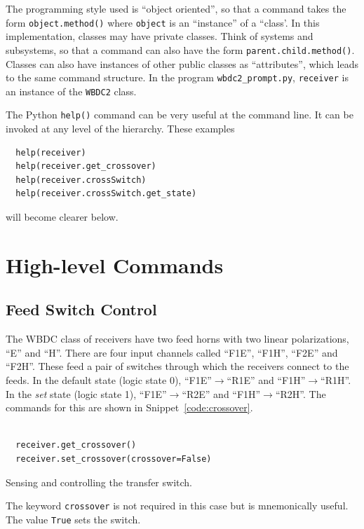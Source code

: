 \documentclass[letterpaper,11pt]{book}
\begin{document}
The programming style used is ``object oriented'', so that a command takes the 
form {\tt object.method()} where {\tt object} is an ``instance'' of a ``class'.
In this implementation, classes may have private classes. Think of systems and 
subsystems, so that a command can also have the form
{\tt parent.child.method()}. Classes can also have instances of other public
classes as ``attributes'', which leads to the same command structure.
In the program {\tt wbdc2\_prompt.py}, {\tt receiver} is an instance of the
{\tt WBDC2} class.

The Python {\tt help()} command can be very useful at the command line.  It can
be invoked at any level of the hierarchy.  These examples 
\begin{verbatim}
  help(receiver)
  help(receiver.get_crossover)
  help(receiver.crossSwitch)
  help(receiver.crossSwitch.get_state)\end{verbatim}
will become clearer below.

\section{High-level Commands}

\subsection{Feed Switch Control}\label{subsec:feed_switch}

The WBDC class of receivers have two feed horns with two linear polarizations,
``E'' and ``H''.  There are four input channels called ``F1E'', ``F1H'',
``F2E'' and ``F2H''.  These feed a pair of switches through which the receivers
connect to the feeds.  In the default state (logic state 0),
``F1E''$\rightarrow$``R1E'' and ``F1H''$\rightarrow$``R1H''.  In the {\it set}
state (logic state 1), ``F1E''$\rightarrow$``R2E'' and 
``F1H''$\rightarrow$``R2H''.  The commands for this are shown in 
Snippet~\ref{code:crossover}.
\begin{code}[h!tb]
\begin{center}
  \begin{verbatim}
  
  receiver.get_crossover()
  receiver.set_crossover(crossover=False)\end{verbatim}
\caption{\label{code:crossover}Sensing and controlling the transfer switch.}
\end{center}
\end{code}
The keyword {\tt crossover} is not required in this case but is
mnemonically useful. The value {\tt True} sets the switch.
\end{document}
